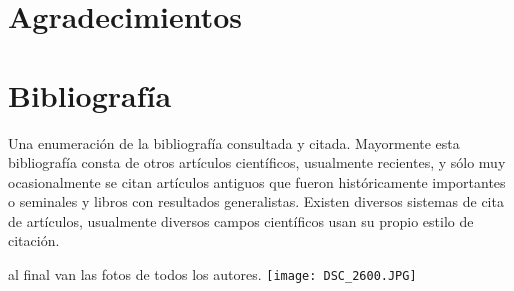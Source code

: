 \documentclass[10pt,letterpaper]{article}
\begin{document}
\begin{multicols}{2}
\section{Agradecimientos}

\section{Bibliografía}
Una enumeración de la bibliografía consultada y citada. Mayormente esta bibliografía consta de otros artículos científicos, usualmente recientes, y sólo muy ocasionalmente se citan artículos antiguos que fueron históricamente importantes o seminales y libros con resultados generalistas. Existen diversos sistemas de cita de artículos, usualmente diversos campos científicos usan su propio estilo de citación.

\begin{thebibliography}{99}
\end{thebibliography}

al final van las fotos de todos los autores.
\texttt{[image: DSC\_2600.JPG]} 


\end{multicols}
\end{document}
